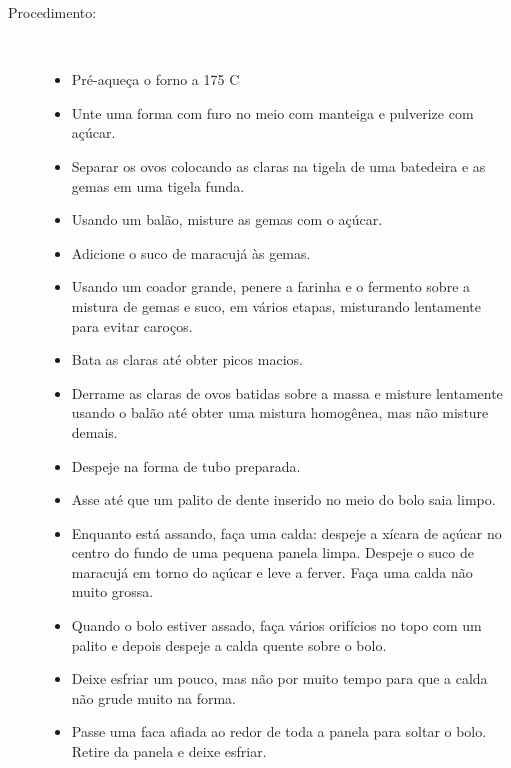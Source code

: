 \documentclass [11pt, letterpaper] {article}
\begin{document}
\begin {description}
\item [Procedimento:] \ \\
\begin {itemize}
\item Pré-aqueça o forno a 175 C
\item Unte uma forma com furo no meio com manteiga e pulverize com açúcar.
\item Separar os ovos colocando as claras na tigela de uma batedeira e as gemas em uma tigela funda.
\item Usando um bal\~ao, misture as gemas com o açúcar.
\item Adicione o suco de maracuj\'a às gemas.
\item Usando um coador grande, penere a farinha e o fermento sobre a mistura de gemas e suco, em vários etapas, misturando lentamente para evitar caro\c{c}os.
\item Bata as claras at\'e obter picos macios.
\item Derrame as claras de ovos batidas sobre a massa e misture lentamente usando o bal\~ao até obter uma mistura homogênea, mas não misture demais.
\item Despeje na forma de tubo preparada.
\item Asse até que um palito de dente inserido no meio do bolo saia limpo.
\item Enquanto está assando, faça uma calda: despeje a x\'icara de açúcar no centro do fundo de uma pequena panela limpa. Despeje o suco de maracuj\'a em torno do açúcar e leve a ferver. Fa\c{c}a uma calda n\~ao muito grossa.
\item Quando o bolo estiver assado, faça vários orifícios no topo com um palito e depois despeje a calda quente sobre o bolo.
\item Deixe esfriar um pouco, mas não por muito tempo para que a calda não grude muito na forma.
\item Passe uma faca afiada ao redor de toda a panela para soltar o bolo. Retire da panela e deixe esfriar.
\end {itemize}
\end {description}
\end{document}
